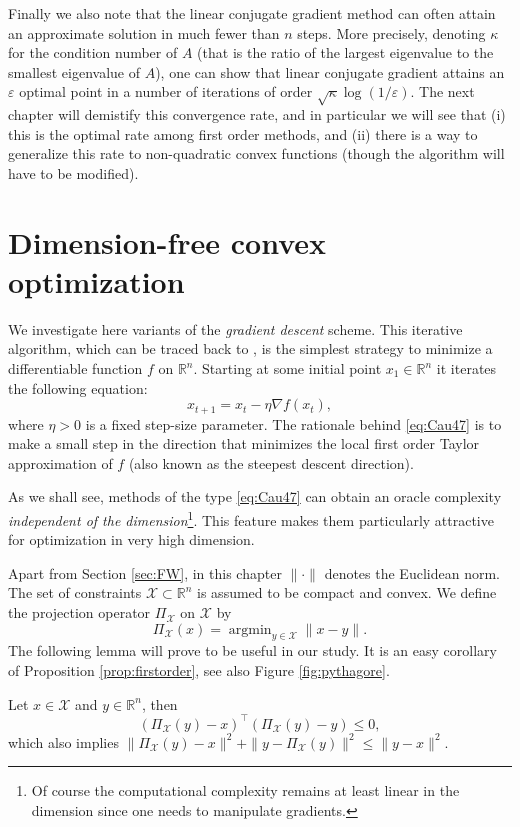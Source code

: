 \documentclass[openany]{now}
\newcommand{\R}{\mathbb{R}}
\newcommand{\cX}{\mathcal{X}}
\renewcommand{\epsilon}{\varepsilon}
\newcommand{\argmin}{\mathop{\mathrm{argmin}}}
\begin{document}
Finally we also note that the linear conjugate gradient method can often attain an approximate solution in much fewer than $n$ steps. More precisely, denoting $\kappa$ for the condition number of $A$ (that is the ratio of the largest eigenvalue to the smallest eigenvalue of $A$), one can show that linear conjugate gradient attains an $\epsilon$ optimal point in a number of iterations of order $\sqrt{\kappa} \log(1/\epsilon)$. The next chapter will demistify this convergence rate, and in particular we will see that (i) this is the optimal rate among first order methods, and (ii) there is a way to generalize this rate to non-quadratic convex functions (though the algorithm will have to be modified).
 
\chapter{Dimension-free convex optimization}
\label{dimfree}
We investigate here variants of the {\em gradient descent} scheme. This iterative algorithm, which can be traced back to \cite{Cau47}, is the simplest strategy to minimize a differentiable function $f$ on $\R^n$. Starting at some initial point $x_1 \in \R^n$ it iterates the following equation:
\begin{equation} \label{eq:Cau47}
x_{t+1} = x_t - \eta \nabla f(x_t) ,
\end{equation}
where $\eta > 0$ is a fixed step-size parameter. The rationale behind \eqref{eq:Cau47} is to make a small step in the direction that minimizes the local first order Taylor approximation of $f$ (also known as the steepest descent direction). 

As we shall see, methods of the type \eqref{eq:Cau47} can obtain an oracle complexity {\em independent of the dimension}\footnote{Of course the computational complexity remains at least linear in the dimension since one needs to manipulate gradients.}. This feature makes them particularly attractive for optimization in very high dimension.

Apart from Section \ref{sec:FW}, in this chapter $\|\cdot\|$ denotes the Euclidean norm. The set of constraints $\cX \subset \R^n$ is assumed to be compact and convex. 
We define the projection operator $\Pi_{\cX}$ on $\cX$ by
$$\Pi_{\cX}(x) = \argmin_{y \in \mathcal{X}} \|x - y\| .$$
The following lemma will prove to be useful in our study. It is an easy corollary of Proposition \ref{prop:firstorder}, see also Figure \ref{fig:pythagore}.

\begin{lemma} \label{lem:todonow}
Let $x \in \cX$ and $y \in \R^n$, then
$$(\Pi_{\cX}(y) - x)^{\top} (\Pi_{\cX}(y) - y) \leq 0 ,$$
which also implies $\|\Pi_{\cX}(y) - x\|^2 + \|y - \Pi_{\cX}(y)\|^2 \leq \|y - x\|^2$.
\end{lemma}
\end{document}
